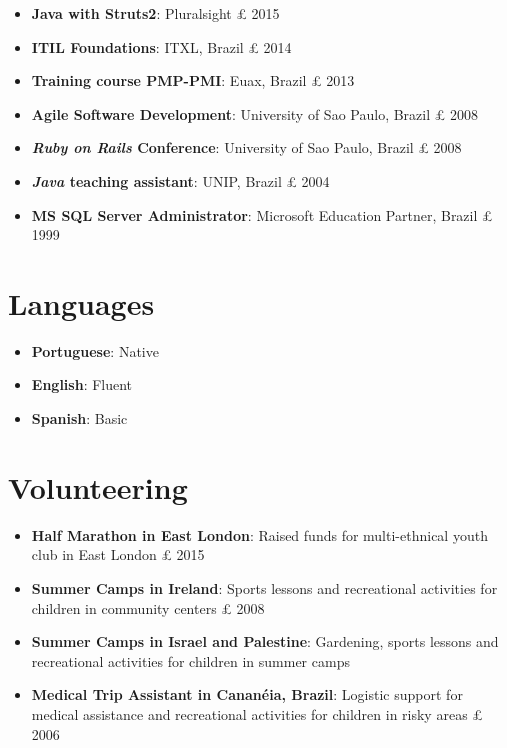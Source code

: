 \documentclass[margin,a4paper]{res}
\begin{document}
{\begin{itemize}
\itemsep1pt\parskip0pt
\item
  \textbf{Java with Struts2}: Pluralsight £ 2015
\item
  \textbf{ITIL Foundations}: ITXL, Brazil £ 2014
\item
  \textbf{Training course PMP-PMI}: Euax, Brazil £ 2013
\item
  \textbf{Agile Software Development}: University of Sao Paulo, Brazil £
  2008
\item
  \textbf{\emph{Ruby on Rails} Conference}: University of Sao Paulo,
  Brazil £ 2008
\item
  \textbf{\emph{Java} teaching assistant}: UNIP, Brazil £ 2004
\item
  \textbf{MS SQL Server Administrator}: Microsoft Education Partner,
  Brazil £ 1999
\end{itemize}

\section{Languages}\label{languages}

\begin{itemize}
\itemsep1pt\parskip0pt
\item
  \textbf{Portuguese}: Native
\item
  \textbf{English}: Fluent
\item
  \textbf{Spanish}: Basic
\end{itemize}

\section{Volunteering}\label{volunteering}

\begin{itemize}
\itemsep1pt\parskip0pt
\item
  \textbf{Half Marathon in East London}: Raised funds for multi-ethnical
  youth club in East London £ 2015
\item
  \textbf{Summer Camps in Ireland}: Sports lessons and recreational
  activities for children in community centers £ 2008
\item
  \textbf{Summer Camps in Israel and Palestine}: Gardening, sports
  lessons and recreational activities for children in summer camps
\item
  \textbf{Medical Trip Assistant in Cananéia, Brazil}: Logistic support
  for medical assistance and recreational activities for children in
  risky areas £ 2006
\end{itemize}}
\end{document}
